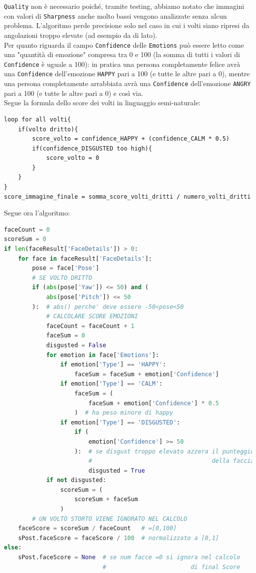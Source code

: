 \verb+Quality+ non è necessario poiché, tramite testing, abbiamo notato che immagini con valori di 
\verb+Sharpness+ anche molto bassi vengono analizzate senza alcun problema. L'algoritmo perde precisione
solo nel caso in cui i volti siano ripresi da angolazioni troppo elevate (ad esempio da di lato).\\
Per quanto riguarda il campo \verb+Confidence+ delle \verb+Emotions+ può essere letto come una
"quantità di emozione" compresa tra 0 e 100 (la somma di tutti i valori di \verb+Confidence+ è uguale a 100):
in pratica una persona completamente felice avrà una \verb+Confidence+ dell'emozione \verb+HAPPY+ pari a 100 
(e tutte le altre pari a 0), mentre una persona completamente arrabbiata avrà una \verb+Confidence+ 
dell'emozione \verb+ANGRY+ pari a 100 (e tutte le altre pari a 0) e così via.\\
Segue la formula dello score dei volti in linguaggio semi-naturale:
\begin{lstlisting}
loop for all volti{
    if(volto dritto){
        score_volto = confidence_HAPPY + (confidence_CALM * 0.5)
        if(confidence_DISGUSTED too high){
            score_volto = 0
        }
    }
}
score_immagine_finale = somma_score_volti_dritti / numero_volti_dritti
\end{lstlisting}
Segue ora l'algoritmo: 
\begin{lstlisting}[language=Python]
faceCount = 0
scoreSum = 0
if len(faceResult['FaceDetails']) > 0:
    for face in faceResult['FaceDetails']:
        pose = face['Pose']
        # SE VOLTO DRITTO
        if (abs(pose['Yaw']) <= 50) and (
            abs(pose['Pitch']) <= 50
        ):  # abs() perche' deve essere -50<pose<50
            # CALCOLARE SCORE EMOZIONI
            faceCount = faceCount + 1
            faceSum = 0
            disgusted = False
            for emotion in face['Emotions']:
                if emotion['Type'] == 'HAPPY':
                    faceSum = faceSum + emotion['Confidence']
                if emotion['Type'] == 'CALM':
                    faceSum = (
                        faceSum + emotion['Confidence'] * 0.5
                    )  # ha peso minore di happy
                if emotion['Type'] == 'DISGUSTED':
                    if (
                        emotion['Confidence'] >= 50
                    ):  # se disgust troppo elevato azzera il punteggio 
                        #                                  della faccia
                        disgusted = True
            if not disgusted: 
                scoreSum = (
                    scoreSum + faceSum
                )  
        # UN VOLTO STORTO VIENE IGNORATO NEL CALCOLO
    faceScore = scoreSum / faceCount   # =[0,100]
    sPost.faceScore = faceScore / 100  # normalizzato a [0,1]
else:
    sPost.faceScore = None  # se num facce =0 si ignora nel calcolo 
                            #                        di final Score 
\end{lstlisting}
